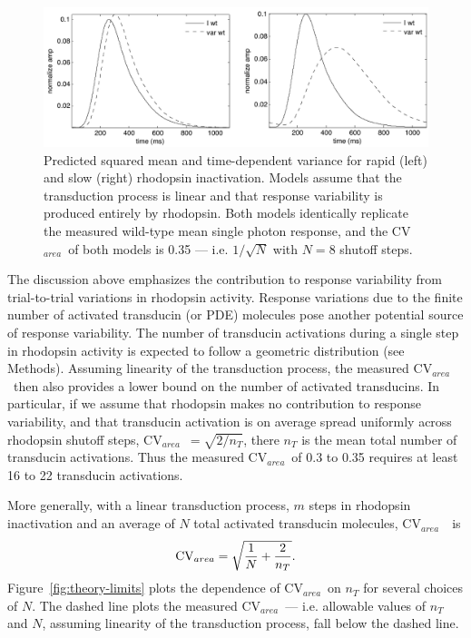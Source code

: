 \documentclass[12pt]{article}
\def\CVArea{CV$_{area}$~}
\begin{document}
\begin{figure}[h]
\begin{center}
\includegraphics[width=5in]{linearity-and-variability.pdf}
\caption{Predicted squared mean and time-dependent variance for rapid (left) and slow (right) rhodopsin inactivation.  Models assume that the transduction process is linear and that response variability is produced entirely by rhodopsin.  Both models identically replicate the measured wild-type mean single photon response, and the \CVArea of both models is 0.35 --- i.e. $1/\sqrt{N}$ with $N=8$ shutoff steps.}  
\label{fig:linearity-and-variability}
\end{center}
\end{figure}

The discussion above emphasizes the contribution to response variability from trial-to-trial variations in rhodopsin activity.  Response variations due to the finite number of activated transducin (or PDE) molecules pose another potential source of response variability.  The number of transducin activations during a single step in rhodopsin activity is expected to follow a geometric distribution (see Methods).  Assuming linearity of the transduction process, the measured \CVArea then also provides a lower bound on the number of activated transducins.  In particular, if we assume that rhodopsin makes no contribution to response variability, and that transducin activation is on average spread uniformly across rhodopsin shutoff steps, \CVArea $ = \sqrt{2/n_T}$, there $n_T$ is the mean total number of transducin activations.  Thus the measured \CVArea of 0.3 to 0.35 requires at least 16 to 22 transducin activations.  
   
More generally, with a linear transduction process, $m$ steps in rhodopsin inactivation and an average of $N$ total activated transducin molecules, \CVArea~is
\begin{equation}
{\rm CV}_{area}  = \sqrt{{1 \over N} + {2 \over n_T}}.
\end{equation}
Figure~\ref{fig:theory-limits} plots the dependence of \CVArea on $n_T$ for several choices of $N$.  The dashed line plots the measured \CVArea --- i.e. allowable values of $n_T$ and $N$, assuming linearity of the transduction process, fall below the dashed line.  
\end{document}
